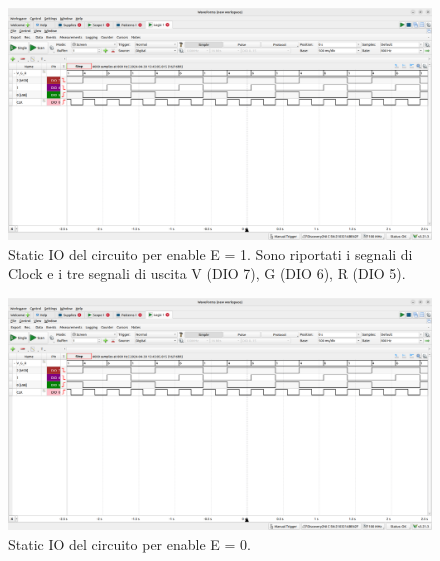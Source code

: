 \documentclass[10pt,a4paper]{article}
\begin{document}
\begin{figure}
    \begin{center}
    \includegraphics[scale=0.20]{fig7.png}
    \caption{Static IO del circuito per enable E = 1. Sono riportati i segnali di Clock e i tre segnali di uscita V (DIO 7), G (DIO 6), R (DIO 5).}
    \label{fig6}
    \end{center}
\end{figure}

\begin{figure}
    \begin{center}
    \includegraphics[scale=0.20]{fig7.png}
    \caption{Static IO del circuito per enable E = 0.}
    \label{fig6}
    \end{center}
\end{figure}
\end{document}

